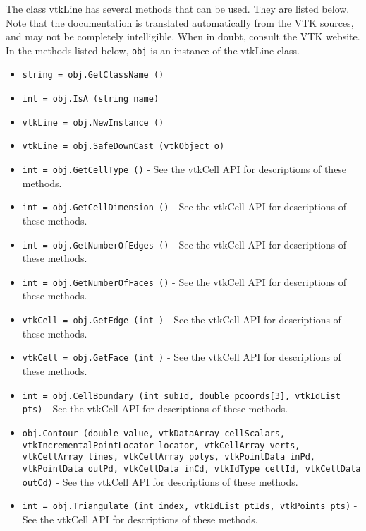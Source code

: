 The class vtkLine has several methods that can be used.
  They are listed below.
Note that the documentation is translated automatically from the VTK sources,
and may not be completely intelligible.  When in doubt, consult the VTK website.
In the methods listed below, \verb|obj| is an instance of the vtkLine class.
\begin{itemize}
\item  \verb|string = obj.GetClassName ()|

\item  \verb|int = obj.IsA (string name)|

\item  \verb|vtkLine = obj.NewInstance ()|

\item  \verb|vtkLine = obj.SafeDownCast (vtkObject o)|

\item  \verb|int = obj.GetCellType ()| -  See the vtkCell API for descriptions of these methods.

\item  \verb|int = obj.GetCellDimension ()| -  See the vtkCell API for descriptions of these methods.

\item  \verb|int = obj.GetNumberOfEdges ()| -  See the vtkCell API for descriptions of these methods.

\item  \verb|int = obj.GetNumberOfFaces ()| -  See the vtkCell API for descriptions of these methods.

\item  \verb|vtkCell = obj.GetEdge (int )| -  See the vtkCell API for descriptions of these methods.

\item  \verb|vtkCell = obj.GetFace (int )| -  See the vtkCell API for descriptions of these methods.

\item  \verb|int = obj.CellBoundary (int subId, double pcoords[3], vtkIdList pts)| -  See the vtkCell API for descriptions of these methods.

\item  \verb|obj.Contour (double value, vtkDataArray cellScalars, vtkIncrementalPointLocator locator, vtkCellArray verts, vtkCellArray lines, vtkCellArray polys, vtkPointData inPd, vtkPointData outPd, vtkCellData inCd, vtkIdType cellId, vtkCellData outCd)| -  See the vtkCell API for descriptions of these methods.

\item  \verb|int = obj.Triangulate (int index, vtkIdList ptIds, vtkPoints pts)| -  See the vtkCell API for descriptions of these methods.


\end{itemize}
